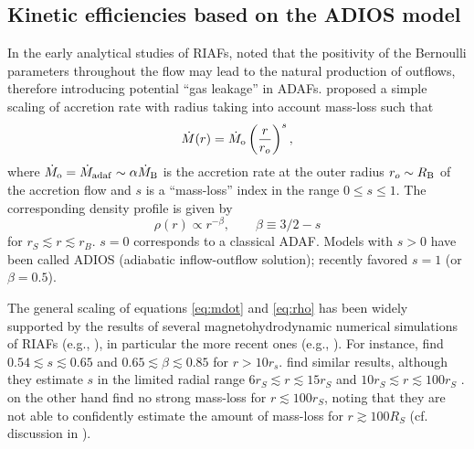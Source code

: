 \documentclass[useAMS,usenatbib]{mn2e}
\begin{document}
\subsection{Kinetic efficiencies based on the ADIOS model}	\label{sec:adios}

In the early analytical studies of RIAFs, \cite{Narayan94,Narayan95b} noted that the positivity of the Bernoulli parameters throughout the flow may lead to the natural production of outflows, therefore introducing potential ``gas leakage'' in ADAFs. \cite{Blandford99} proposed a simple scaling of accretion rate with radius taking into account mass-loss such that  
\begin{equation}	\label{eq:mdot}
\dot{M}(r) = \dot{M}_{\rm o} \left( \frac{r}{r_o} \right)^s,
\end{equation}
where $\dot{M}_{\rm o} = \dot{M}_{\rm adaf} \sim \alpha \dot{M}_{\rm B}$ is the accretion rate at the outer radius $r_o \sim R_{\rm B}$ of the accretion flow and $s$ is a ``mass-loss'' index in the range $0 \leq s \leq 1$. The corresponding density profile is given by 
\begin{equation}	\label{eq:rho}
\rho(r) \propto r^{-\beta}, \qquad  \beta \equiv 3/2 - s
\end{equation}
for $r_S \lesssim r \lesssim r_B$. 
$s=0$ corresponds to a classical ADAF. Models with $s>0$ have been called ADIOS (adiabatic inflow-outflow solution); recently \cite{Begelman12} favored $s=1$ (or $\beta=0.5$). 

The general scaling of equations \ref{eq:mdot} and \ref{eq:rho} has been widely supported by the results of several magnetohydrodynamic numerical simulations of RIAFs (e.g., \citealt{Stone99, Hawley01, Igumenshchev03, Proga03}), in particular the more recent ones (e.g., \citealt{Pang11, McKinney12, Yuan12,Sadowski13sim}). For instance, \cite{Yuan12} find $0.54 \lesssim s \lesssim 0.65$ and $0.65 \lesssim \beta \lesssim 0.85$ for $r>10 r_s$. \cite{McKinney12,Sadowski13sim} find similar results, although they estimate $s$ in the limited radial range $6 r_S \lesssim r \lesssim 15 r_S$ \citep{McKinney12} and $10 r_S \lesssim r \lesssim 100 r_S$ \citep{Sadowski13sim}. \cite{Narayan12grmhd} on the other hand find no strong mass-loss for $r \lesssim 100 r_S$, noting that they are not able to confidently estimate the amount of mass-loss for $r \gtrsim 100 R_S$ (cf. discussion in \citealt{Yuan12}). 
\end{document}
